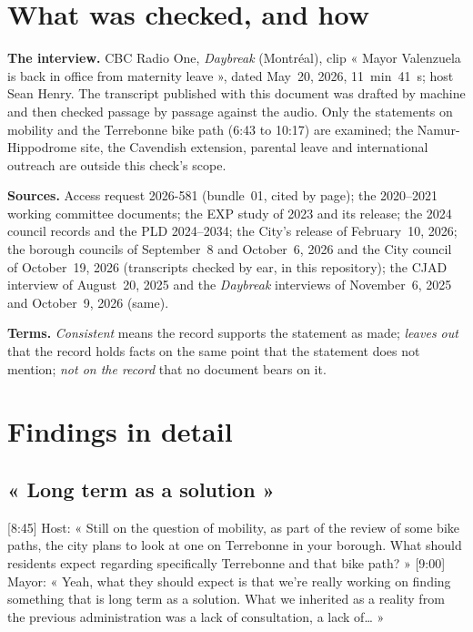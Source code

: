 \documentclass[11pt,letterpaper]{article}
\newcommand{\cliptime}[1]{\textsf{\small[#1]}}
\begin{document}
\section{What was checked, and how}

\textbf{The interview.} CBC Radio One, \emph{Daybreak} (Montréal), clip
« Mayor Valenzuela is back in office from maternity leave », dated May~20,
2026, 11~min~41~s; host Sean Henry. The transcript published with this
document was drafted by machine and then checked passage by passage against
the audio. Only the statements on mobility and the Terrebonne bike path
(6:43 to 10:17) are examined; the Namur-Hippodrome site, the Cavendish
extension, parental leave and international outreach are outside this
check's scope.

\textbf{Sources.} Access request 2026-581 (bundle~01, cited by page); the
2020--2021 working committee documents; the EXP study of 2023 and its
release; the 2024 council records and the PLD 2024--2034; the City's release
of February~10, 2026; the borough councils of September~8 and October~6,
2026 and the City council of October~19, 2026 (transcripts checked by ear,
in this repository); the CJAD interview of August~20, 2025 and the
\emph{Daybreak} interviews of November~6, 2025 and October~9, 2026 (same).

\textbf{Terms.} \emph{Consistent} means the record supports the statement as
made; \emph{leaves out} that the record holds facts on the same point that
the statement does not mention; \emph{not on the record} that no document
bears on it.

\section{Findings in detail}

\subsection{« Long term as a solution »}

\cliptime{8:45} Host: « Still on the question of mobility, as part of the
review of some bike paths, the city plans to look at one on Terrebonne in
your borough. What should residents expect regarding specifically Terrebonne
and that bike path? » \cliptime{9:00} Mayor: « Yeah, what they should expect
is that we're really working on finding something that is long term as a
solution. What we inherited as a reality from the previous administration
was a lack of consultation, a lack of… »
\end{document}
